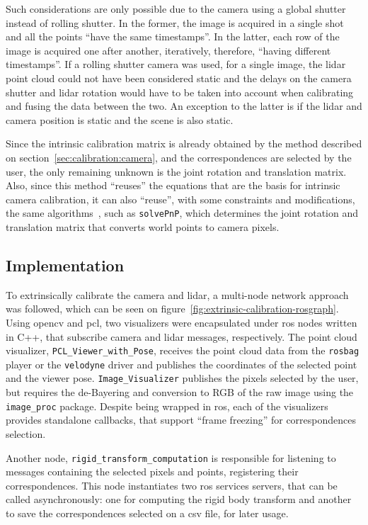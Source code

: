 Such considerations are only possible due to the camera using a global shutter instead of rolling shutter. In the former, the image is acquired in a single shot and all the points ``have the same timestamps''. In the latter, each row of the image is acquired one after another, iteratively, therefore, ``having different timestamps''. If a rolling shutter camera was used, for a single image, the \ac{lidar} point cloud could not have been considered static and the delays on the camera shutter and \ac{lidar} rotation would have to be taken into account when calibrating and fusing the data between the two. An exception to the latter is if the \ac{lidar} and camera position is static and the scene is also static.

Since the intrinsic calibration matrix is already obtained by the method described on section~\ref{sec:calibration:camera}, and the correspondences are selected by the user, the only remaining unknown is the joint rotation and translation matrix. Also, since this method ``reuses'' the equations that are the basis for intrinsic camera calibration, it can also ``reuse'', with some constraints and modifications, the same algorithms~\cite{opencv_doc}, such as \texttt{solvePnP}, which determines the joint rotation and translation matrix that converts world points to camera pixels.


\subsection{Implementation}
To extrinsically calibrate the camera and \ac{lidar}, a multi-node network approach was followed, which can be seen on figure~\ref{fig:extrinsic-calibration-rosgraph}. Using \ac{opencv} and \ac{pcl}, two visualizers were encapsulated under \ac{ros} nodes written in C++, that subscribe camera and \ac{lidar} messages, respectively. The point cloud visualizer, \texttt{PCL\_Viewer\_with\_Pose}, receives the point cloud data from the \texttt{rosbag} player or the \texttt{velodyne} driver and publishes the coordinates of the selected point and the viewer pose. \texttt{Image\_Visualizer} publishes the pixels selected by the user, but requires the de-Bayering and conversion to RGB of the raw image using the \texttt{image\_proc} package. Despite being wrapped in \ac{ros}, each of the visualizers provides standalone callbacks, that support ``frame freezing'' for correspondences selection.

Another node, \texttt{rigid\_transform\_computation} is responsible for listening to messages containing the selected pixels and points, registering their correspondences. This node  instantiates two \ac{ros} services servers, that can be called asynchronously: one for computing the rigid body transform and another to save the correspondences selected on a \ac{csv} file, for later usage. 

